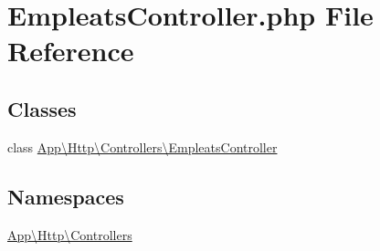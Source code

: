 \hypertarget{_empleats_controller_8php}{}\section{Empleats\+Controller.\+php File Reference}
\label{_empleats_controller_8php}
\subsection*{Classes}
\begin{DoxyCompactItemize}
\item 
class \mbox{\hyperlink{class_app_1_1_http_1_1_controllers_1_1_empleats_controller}{App\textbackslash{}\+Http\textbackslash{}\+Controllers\textbackslash{}\+Empleats\+Controller}}
\end{DoxyCompactItemize}
\subsection*{Namespaces}
\begin{DoxyCompactItemize}
\item 
 \mbox{\hyperlink{namespace_app_1_1_http_1_1_controllers}{App\textbackslash{}\+Http\textbackslash{}\+Controllers}}
\end{DoxyCompactItemize}
